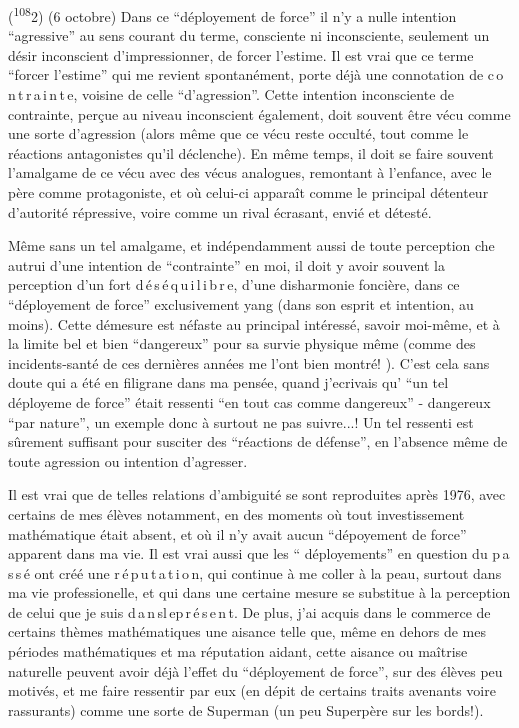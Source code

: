 (\textsuperscript{108}2) (6 octobre) Dans ce ``déployement de force'' il n'y a nulle intention ``agressive'' au sens courant du terme, consciente ni inconsciente, seulement un désir inconscient d'impressionner, de forcer l'estime. Il est vrai que ce terme ``forcer l'estime'' qui me revient spontanément, porte déjà une connotation de c\,o\,n\,t\,r\,a\,i\,n\,t\,e, voisine de celle ``d'agression''. Cette intention inconsciente de contrainte, perçue au niveau inconscient également, doit souvent être vécu comme une sorte d'agression (alors même que ce vécu reste occulté, tout comme le réactions antagonistes qu'il déclenche). En même temps, il doit se faire souvent l'amalgame de ce vécu avec des vécus analogues, remontant à l'enfance, avec le père comme protagoniste, et où celui-ci apparaît comme le principal détenteur d'autorité répressive, voire comme un rival écrasant, envié et détesté.

Même sans un tel amalgame, et indépendamment aussi de toute perception che autrui d'une intention de ``contrainte'' en moi, il doit y avoir souvent la perception d'un fort d\,é\,s\,é\,q\,u\,i\,l\,i\,b\,r\,e, d'une disharmonie foncière, dans ce ``déployement de force'' exclusivement yang (dans son esprit et intention, au moins). Cette démesure est néfaste au principal intéressé, savoir moi-même, et à la limite bel et bien ``dangereux'' pour sa survie physique même (comme des incidents-santé de ces dernières années me l'ont bien montré! ). C'est cela sans doute qui a été en filigrane dans ma pensée, quand j'ecrivais qu' ``un tel déployeme de force'' était ressenti ``en tout cas comme dangereux'' - dangereux ``par nature'', un exemple donc à surtout ne pas suivre...! Un tel ressenti est sûrement suffisant pour susciter des ``réactions de défense'', en l'absence même de toute agression ou intention d'agresser.

Il est vrai que de telles relations d'ambiguité se sont reproduites après 1976, avec certains de mes élèves notamment, en des moments où tout investissement mathématique était absent, et où il n'y avait aucun ``dépoyement de force'' apparent dans ma vie. Il est vrai aussi que les `` déployements'' en question du p\,a\,s\,s\,é ont créé une r\,é\,p\,u\,t\,a\,t\,i\,o\,n, qui continue à me coller à la peau, surtout dans ma vie professionelle, et qui dans une certaine mesure se substitue à la perception de celui que je suis d\,a\,n\,s\quad l\,e\quad p\,r\,é\,s\,e\,n\,t. De plus, j'ai acquis dans le commerce de certains thèmes mathématiques une aisance telle que, même en dehors de mes périodes mathématiques et ma réputation aidant, cette aisance ou maîtrise naturelle peuvent avoir déjà l'effet du ``déployement de force'', sur des élèves peu motivés, et me faire ressentir par eux (en dépit de certains traits avenants voire rassurants) comme une sorte de Superman (un peu Superpère sur les bords!).\margin{\unsure{-}}
